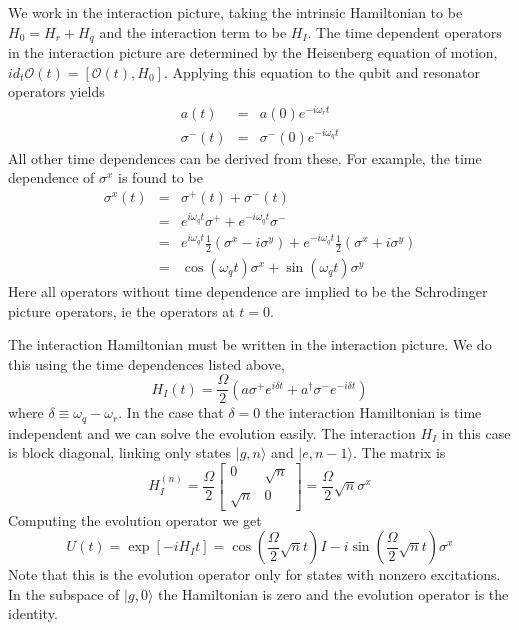\documentclass[twocolumn]{article}
\begin{document}
We work in the interaction picture, taking the intrinsic Hamiltonian
to be $H_{0}=H_{r}+H_{q}$ and the interaction term to be $H_{I}$.
The time dependent operators in the interaction picture are determined
by the Heisenberg equation of motion, $id_{t}\mathcal{O}(t)=[\mathcal{O}(t),H_{0}]$.
Applying this equation to the qubit and resonator operators yields\begin{eqnarray*}
a(t) & = & a(0)e^{-i\omega_{r}t}\\
\sigma^{-}(t) & = & \sigma^{-}(0)e^{-i\omega_{q}t}\end{eqnarray*}
All other time dependences can be derived from these. For example,
the time dependence of $\sigma^{x}$ is found to be\begin{eqnarray*}
\sigma^{x}(t) & = & \sigma^{+}(t)+\sigma^{-}(t)\\
& = & e^{i\omega_{q}t}\sigma^{+}+e^{-i\omega_{q}t}\sigma^{-}\\
& = & e^{i\omega_{q}t}\frac{1}{2}\left(\sigma^{x}-i\sigma^{y}\right)+e^{-i\omega_{q}t}\frac{1}{2}\left(\sigma^{x}+i\sigma^{y}\right)\\
& = & \cos\left(\omega_{q}t\right)\sigma^{x}+\sin\left(\omega_{q}t\right)\sigma^{y}\end{eqnarray*}
Here all operators without time dependence are implied to be the Schrodinger
picture operators, ie the operators at $t=0$.

The interaction Hamiltonian must be written in the interaction picture.
We do this using the time dependences listed above, \begin{equation}
H_{I}(t)=\frac{\Omega}{2}\left(a\sigma^{+}e^{i\delta t}+a^{\dagger}\sigma^{-}e^{-i\delta t}\right) \end{equation}
where $\delta\equiv\omega_{q}-\omega_{r}$. In the case that $\delta=0$
the interaction Hamiltonian is time independent and we can solve the
evolution easily. The interaction $H_{I}$ in this case is block diagonal,
linking only states $|g,n\rangle$ and $|e,n-1\rangle$. The matrix
is \begin{equation}
H_{I}^{(n)}=\frac{\Omega}{2}\left[\begin{array}{cc}
0 & \sqrt{n}\\
\sqrt{n} & 0\end{array}\right]=\frac{\Omega}{2}\sqrt{n}\sigma^{x} \end{equation}
Computing the evolution operator we get \begin{equation}
U(t)=\exp\left[-iH_{I}t\right]=\cos\left(\frac{\Omega}{2}\sqrt{n}t\right)I-i\sin\left(\frac{\Omega}{2}\sqrt{n}t\right)\sigma^{x} \end{equation}
Note that this is the evolution operator only for states with nonzero excitations. In the subspace of $|g,0\rangle$ the Hamiltonian is zero and the evolution operator is the identity.
\end{document}
